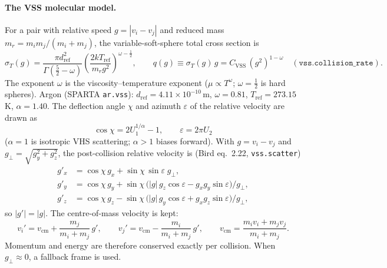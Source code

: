 \documentclass[11pt,a4paper]{article}
\numberwithin{equation}{section}
\newcommand{\code}[1]{\texttt{#1}}
\begin{document}
\paragraph{The VSS molecular model.}
For a pair with relative speed $g = |v_i - v_j|$ and reduced mass
$m_r = m_i m_j/(m_i + m_j)$, the variable-soft-sphere total cross section is
\begin{equation}
\label{eq:vss-sigma}
\sigma_T(g) = \frac{\pi d_{\mathrm{ref}}^2}{\Gamma(\tfrac52-\omega)}
\left(\frac{2kT_{\mathrm{ref}}}{m_r g^2}\right)^{\omega-\frac12},
\qquad
q(g) \equiv \sigma_T(g)\,g = C_{\mathrm{VSS}}\,(g^2)^{1-\omega}
\quad(\code{vss.collision\_rate}).
\end{equation}
The exponent $\omega$ is the viscosity--temperature exponent ($\mu\propto T^\omega$;
$\omega = \frac12$ is hard spheres).  Argon (SPARTA \code{ar.vss}):
$d_{\mathrm{ref}} = 4.11\times10^{-10}$\,m, $\omega = 0.81$,
$T_{\mathrm{ref}} = 273.15$\,K, $\alpha = 1.40$.
The deflection angle $\chi$ and azimuth $\varepsilon$ of the relative velocity are
drawn as
\begin{equation}
\label{eq:vss-angles}
\cos\chi = 2U_1^{1/\alpha} - 1,\qquad \varepsilon = 2\pi U_2
\end{equation}
($\alpha = 1$ is isotropic VHS scattering; $\alpha > 1$ biases forward).  With
$g = v_i - v_j$ and $g_\perp = \sqrt{g_y^2 + g_z^2}$, the post-collision relative
velocity is (Bird eq.~2.22, \code{vss.scatter})
\begin{equation}
\label{eq:vss-scatter}
\begin{aligned}
g'_x &= \cos\chi\, g_x + \sin\chi\,\sin\varepsilon\; g_\perp,\\
g'_y &= \cos\chi\, g_y + \sin\chi\,\big(|g|\, g_z\cos\varepsilon - g_x g_y \sin\varepsilon\big)/g_\perp,\\
g'_z &= \cos\chi\, g_z - \sin\chi\,\big(|g|\, g_y\cos\varepsilon + g_x g_z \sin\varepsilon\big)/g_\perp,
\end{aligned}
\end{equation}
so $|g'| = |g|$.  The centre-of-mass velocity is kept:
\begin{equation}
\label{eq:vss-post}
v_i' = v_{\mathrm{cm}} + \frac{m_j}{m_i + m_j}\, g',\qquad
v_j' = v_{\mathrm{cm}} - \frac{m_i}{m_i + m_j}\, g',\qquad
v_{\mathrm{cm}} = \frac{m_i v_i + m_j v_j}{m_i + m_j}.
\end{equation}
Momentum and energy are therefore conserved exactly per collision.  When
$g_\perp \approx 0$, a fallback frame is used.
\end{document}
